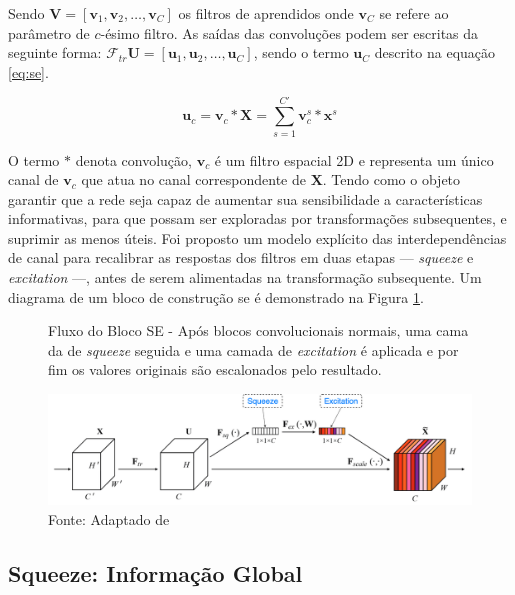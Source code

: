 Sendo $\mathbf{V} = [\mathbf{v}_1, \mathbf{v}_2, \ldots, \mathbf{v}_C]$ os filtros de aprendidos onde $\mathbf{v}_C$ se refere ao parâmetro de $c$-ésimo filtro. As saídas das convoluções podem ser escritas da seguinte forma: $\mathcal{F}_{tr} \mathbf{U} = [\mathbf{u}_1, \mathbf{u}_2, \ldots, \mathbf{u}_C]$, sendo o termo $\mathbf{u}_C$ descrito na equação \ref{eq:se}. 

\begin{equation}
\mathbf{u}_c = \mathbf{v}_c \ast \mathbf{X} = \sum_{s=1}^{C'} \mathbf{v}_c^s \ast \mathbf{x}^s
\label{eq:se}
\end{equation}

O termo $\ast$ denota convolução, $\mathbf{v}_c$ é um filtro espacial 2D e representa um único canal de $\mathbf{v}_c$ que atua no canal correspondente de $\mathbf{X}$. 
Tendo como o objeto garantir que a rede seja capaz de aumentar sua sensibilidade a características informativas, para que possam ser exploradas por transformações subsequentes, e suprimir as menos úteis. Foi proposto um modelo explícito das interdependências de canal para recalibrar as respostas dos filtros em duas etapas — \textit{squeeze} e \textit{excitation} —, antes de serem alimentadas na transformação subsequente. Um diagrama de um bloco de construção \gls{se} é demonstrado na Figura \ref{fig:fig025}.

\begin{figure}[h!]
    \centering
    \captionsetup{width=0.98\textwidth, justification=justified}
    \caption{Fluxo do Bloco SE - Após blocos convolucionais normais, uma cama da de \textit{squeeze} seguida e uma camada de \textit{excitation} é aplicada e por fim os valores originais são escalonados pelo resultado.}
    \includegraphics[height=0.27\textwidth]{figures/fig025.png}
    \caption*{Fonte: Adaptado de \cite{huSqueezeandExcitationNetworks2018}}
    \label{fig:fig025}
\end{figure}


\subsection{Squeeze: Informação Global}
\label{subsec:squeeze}

